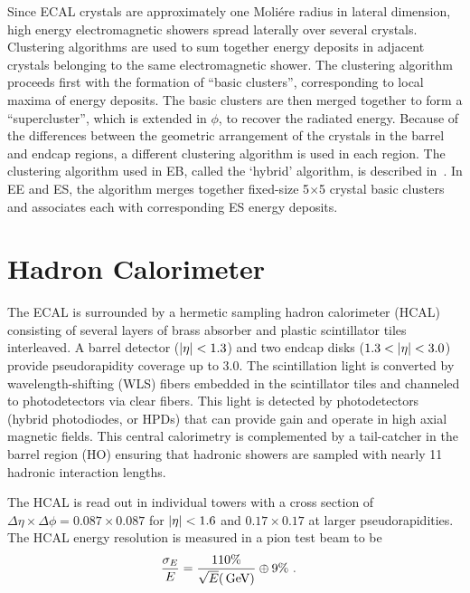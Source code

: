 Since ECAL crystals are approximately one Moli\'ere radius in lateral
dimension, high energy electromagnetic showers spread laterally over
several crystals. 
Clustering algorithms are used to sum together energy
deposits in adjacent crystals belonging to the same electromagnetic
shower. The clustering algorithm proceeds first with the formation of ``basic clusters'', corresponding
to local maxima of energy deposits. The basic clusters are then merged
together to form a ``supercluster'', which is extended in
$\phi$, to recover the radiated energy. Because of the differences
between the geometric arrangement of the crystals in the barrel and
endcap regions, a different clustering algorithm is used in each
region. The clustering algorithm used in EB, called the `hybrid'
algorithm, is described in~\cite{CMS_TDR_v1}. In EE and ES, the
algorithm merges together fixed-size 5$\times$5 crystal basic clusters
and associates each with corresponding ES energy deposits.

\section{Hadron Calorimeter}
\label{sec:hcal}

The ECAL is surrounded by a hermetic sampling hadron
calorimeter (HCAL) consisting of several layers of brass absorber and plastic scintillator
tiles interleaved. A barrel detector ($\lvert \eta \rvert<1.3$) and two endcap
disks ($1.3<\lvert \eta \rvert<3.0$) provide pseudorapidity coverage up to
$3.0$. The scintillation light is converted by wavelength-shifting (WLS) fibers
embedded in the scintillator tiles and channeled to photodetectors via
clear fibers. This light is detected by photodetectors (hybrid
photodiodes, or HPDs) that can provide gain and operate in high axial
magnetic fields. This central calorimetry is complemented by a
tail-catcher in the barrel region (HO) ensuring that hadronic
showers are sampled with nearly 11 hadronic interaction
lengths.

The HCAL is read out in individual towers with a cross section of
$\Delta\eta\times\Delta\phi = 0.087 \times 0.087$ for $\lvert \eta \rvert<1.6$
and $0.17\times 0.17$ at larger pseudorapidities. The HCAL energy resolution is measured in a pion test beam to
be~\cite{Abdullin:2009zz}
\begin{align}
\frac{\sigma_E}{E} &= \frac{110\%}{\sqrt E (\,\text{Ge\hspace{-.08em}V})} \oplus 9\%~.
\end{align}

